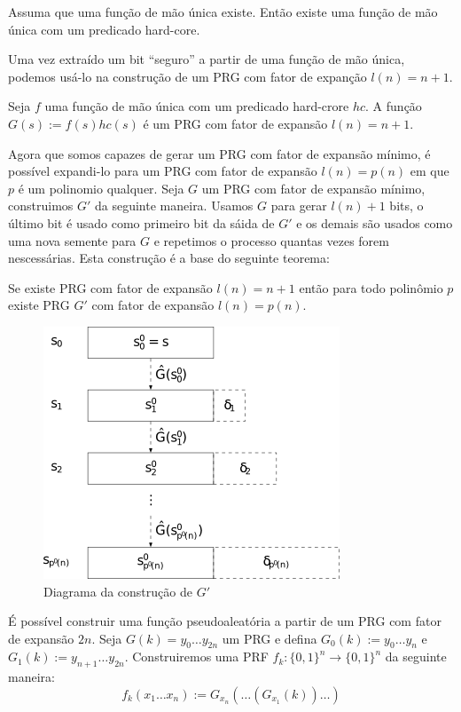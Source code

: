 \begin{theorem}
  Assuma que uma função de mão única existe. Então existe uma função de mão única com um predicado hard-core.
\end{theorem}

Uma vez extraído um bit ``seguro'' a partir de uma função de mão única, podemos usá-lo na construção de um PRG com fator de expanção $l(n) = n + 1$.

\begin{theorem}
  Seja $f$ uma função de mão única com um predicado hard-crore $hc$.
A função $G(s) := f(s)hc(s)$ é um PRG com fator de expansão $l(n) = n+1$.
\end{theorem}

Agora que somos capazes de gerar um PRG com fator de expansão mínimo, é possível expandi-lo para um PRG com fator de expansão $l(n) = p(n)$ em que $p$ é um polinomio qualquer.
Seja $G$ um PRG com fator de expansão mínimo, construimos $G'$ da seguinte maneira.
Usamos $G$ para gerar $l(n)+1$ bits, o último bit é usado como primeiro bit da sáida de $G'$ e os demais são usados como uma nova semente para $G$ e repetimos o processo quantas vezes forem nescessárias.
Esta construção é a base do seguinte teorema:


\begin{theorem}
  Se existe PRG com fator de expansão $l(n) = n + 1$ então para todo polinômio $p$ existe PRG $G'$ com fator de expansão $l(n) = p(n)$.
\end{theorem}

\begin{figure}[htbp]
  \centering
    \includegraphics[width=.5\textwidth]{imagens/OWF-PRG.png}
  \caption{Diagrama da construção de $G'$}
  \label{fig:owf-prg}
\end{figure}

É possível construir uma função pseudoaleatória a partir de um PRG com fator de expansão $2n$.
Seja $G(k) = y_0 \dots y_{2n}$ um PRG e defina $G_0(k) := y_0 \dots y_n$ e $G_1(k) := y_{n+1} \dots y_{2n}$.
Construiremos uma PRF $f_k: \{0,1\}^n \to \{0,1\}^n$ da seguinte maneira:
\begin{displaymath}
  f_k(x_1 \dots x_n) := G_{x_n}(\dots (G_{x_1}(k))\dots)
\end{displaymath}

